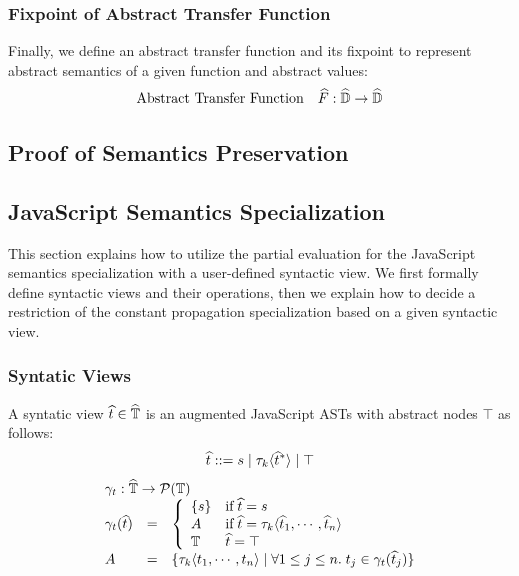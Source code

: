 \subsubsection{Fixpoint of Abstract Transfer Function} Finally, we define an
abstract transfer function and its fixpoint to represent abstract semantics of a
given function and abstract values:
\[
  \begin{array}{ll}
    \text{Abstract Transfer Function} & \widehat{F}: \widehat{\mathbb{D}} \rightarrow
    \widehat{\mathbb{D}}\\
\end{array}
\]

\todo


\subsection{Proof of Semantics Preservation}

\todo





\subsection{JavaScript Semantics Specialization}

This section explains how to utilize the partial evaluation for the JavaScript
semantics specialization with a user-defined syntactic view.  We first formally
define syntactic views and their operations, then we explain how to decide a
restriction of the constant propagation specialization based on a given
syntactic view.

\subsubsection{Syntatic Views} A syntatic view $\widehat{t} \in \widehat{\mathbb{T}}$ is an
augmented JavaScript ASTs with abstract nodes $\top$ as follows:
\[
  \widehat{t} ::= s \mid \tau_k \langle \widehat{t}^* \rangle \mid \top
\]
\[
  \begin{array}{lcl}
    \multicolumn{3}{l}{\treegamma: \atreeset \rightarrow \powerset{\treeset}}\\
    \treegamma(\atree) &=& \left\{
      \begin{array}{ll}
        \{ \str \} &
        \text{if} \; \atree = \str \\

        A & \text{if} \; \atree = \ty_k
        \langle \atree_1, \cdots, \atree_n \rangle \\

        \treeset & \atree = \top\\
      \end{array}
    \right.\\
    A &=& \{ \ty_k \langle \tree_1, \cdots, \tree_n \rangle \mid \forall 1 \leq
    j \leq n.  \; \tree_j \in \treegamma(\atree_j) \}
  \end{array}
\]

